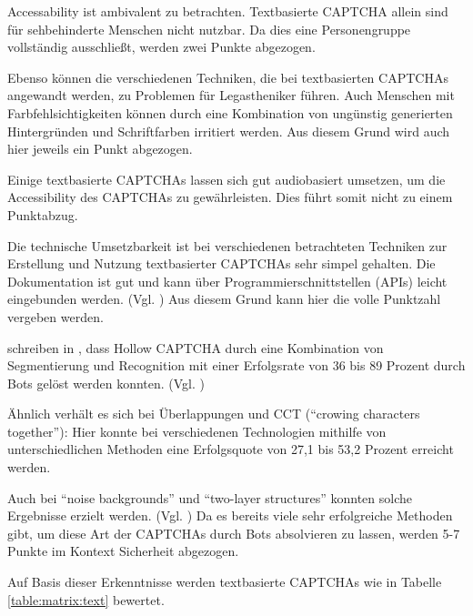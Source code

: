 Accessability ist ambivalent zu betrachten.
Textbasierte CAPTCHA allein sind für sehbehinderte Menschen nicht nutzbar. 
Da dies eine Personengruppe vollständig ausschließt, werden zwei Punkte abgezogen.

Ebenso können die verschiedenen Techniken, die bei textbasierten CAPTCHAs angewandt werden, zu Problemen für Legastheniker führen.
Auch Menschen mit Farbfehlsichtigkeiten können durch eine Kombination von ungünstig generierten Hintergründen und Schriftfarben irritiert werden.
Aus diesem Grund wird auch hier jeweils ein Punkt abgezogen.

Einige textbasierte CAPTCHAs lassen sich gut audiobasiert umsetzen, 
um die Accessibility des CAPTCHAs zu gewährleisten. 
Dies führt somit nicht zu einem Punktabzug.

Die technische Umsetzbarkeit ist bei verschiedenen betrachteten Techniken zur Erstellung und Nutzung textbasierter CAPTCHAs sehr simpel gehalten.
Die Dokumentation ist gut und kann über Programmierschnittstellen (APIs) leicht eingebunden werden. (Vgl. \cite{hcaptcha} \cite{phpcaptcha} \cite{reallysimplecaptcha})
Aus diesem Grund kann hier die volle Punktzahl vergeben werden.

\citeauthor{surveyofresearch} schreiben in , 
dass Hollow CAPTCHA durch eine Kombination von Segmentierung und Recognition %
mit einer Erfolgsrate von 36 bis 89 Prozent durch Bots gelöst werden konnten. (Vgl. \cite[p.76ff]{surveyofresearch}) %

Ähnlich verhält es sich bei Überlappungen und CCT (``crowing characters together''):
Hier konnte bei verschiedenen Technologien mithilfe von unterschiedlichen Methoden
eine Erfolgsquote von 27,1 bis 53,2 Prozent erreicht werden. \cite[p.76]{surveyofresearch} %

Auch bei ``noise backgrounds'' und ``two-layer structures'' konnten solche Ergebnisse erzielt werden. 
(Vgl. \cite[p.76]{surveyofresearch})
Da es bereits viele sehr erfolgreiche Methoden gibt, um diese Art der CAPTCHAs durch Bots absolvieren zu lassen,
werden 5-7 Punkte im Kontext Sicherheit abgezogen. 

Auf Basis dieser Erkenntnisse werden textbasierte CAPTCHAs wie in Tabelle \ref{table:matrix:text} bewertet.


